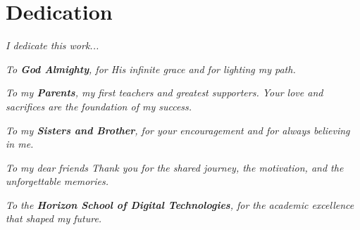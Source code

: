 \chapter*{Dedication}

\vspace*{2cm}

\begin{center}
	\textit{I dedicate this work...}
	
	\vspace{1cm}
	
	\textit{To \textbf{God Almighty}, for His infinite grace and for lighting my path.}
	
	\vspace{0.6cm}
	
	\textit{To my \textbf{Parents}, my first teachers and greatest supporters. Your love and sacrifices are the foundation of my success.}
	
	\vspace{0.6cm}
	
	\textit{To my \textbf{Sisters and Brother}, for your encouragement and for always believing in me.}
	
	\vspace{0.6cm}
	
	\textit{To my dear friends Thank you for the shared journey, the motivation, and the unforgettable memories.}
	
	\vspace{0.6cm}
	
	\textit{To the \textbf{Horizon School of Digital Technologies}, for the academic excellence that shaped my future.}
\end{center}

